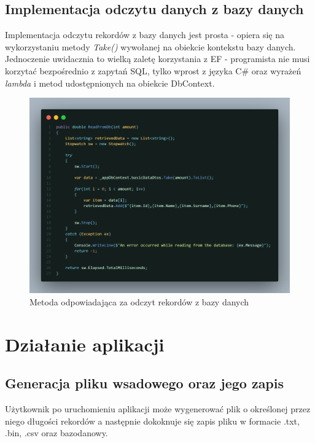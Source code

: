\documentclass{report}
\begin{document}
\subsection{\Large Implementacja odczytu danych z bazy danych}

Implementacja odczytu rekordów z bazy danych jest prosta - opiera się na wykorzystaniu metody \textit{Take()} wywołanej na obiekcie kontekstu bazy danych. Jednoczenie uwidacznia to wielką zaletę korzystania z EF - programista nie musi korzytać bezpośrednio z zapytań SQL, tylko wprost z języka C\# oraz wyrażeń \textit{lambda} i metod udostępnionych na obiekcie DbContext. 

\begin{figure}[H]
    \centering
    \includegraphics[width=1.0\textwidth]{src/db-read.png}
    \caption{Metoda odpowiadająca za odczyt rekordów z bazy danych}
\end{figure}

\section{Działanie aplikacji}
\subsection{Generacja pliku wsadowego oraz jego zapis}
Użytkownik po uruchomieniu aplikacji może wygenerować plik o określonej przez niego długości rekordów a następnie dokoknuje się zapis pliku w formacie .txt, .bin, .csv oraz bazodanowy.
\end{document}
